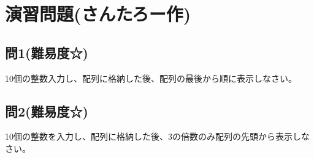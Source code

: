 \section{演習問題(さんたろー作)}
\subsection{問1(難易度☆)}
10個の整数入力し、配列に格納した後、配列の最後から順に表示しなさい。

\subsection{問2(難易度☆)}
10個の整数を入力し、配列に格納した後、3の倍数のみ配列の先頭から表示しなさい。
